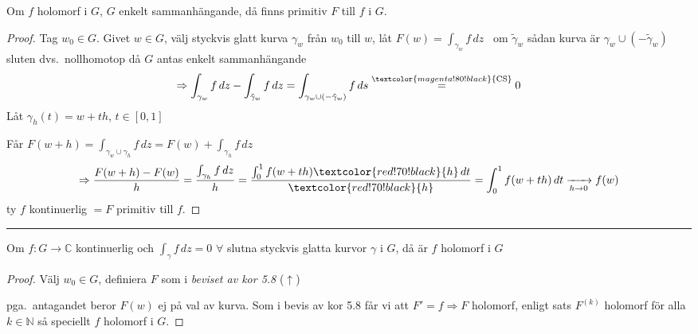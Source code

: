 \begin{theorem}[Kor 5.8]
Om $f$ holomorf i $G$, $G$ enkelt sammanhängande, då finns primitiv $F$ till $f$ i $G$.
\end{theorem}
\begin{proof}
Tag $w_0 \in G$. Givet $w \in G$, välj styckvis glatt kurva $\gamma_w$ från $w_0$ till $w$, låt $F(w) = \displaystyle\int_{\gamma_w} f\,dz$ \ om $\tilde{\gamma}_w$ sådan kurva är $\gamma_w \cup (-\tilde{\gamma}_w)$ sluten dvs.\ nollhomotop då $G$ antas enkelt sammanhängande
\[ \Rightarrow \int_{\gamma_w} f\,dz - \int_{\tilde{\gamma}_w} f\,dz = \int_{\gamma_w \cup (-\tilde{\gamma}_w)} f\,ds \overset{\textcolor{magenta!80!black}{\text{CS}}}{=} 0 \]
Låt $\gamma_h(t) = w + th$, $t \in [0, 1]$

Får $F(w + h) = \displaystyle\int_{\gamma_w \cup \gamma_h} f\,dz = F(w) + \int_{\gamma_h} f\,dz$
\[ \Rightarrow \frac{F(w + h) - F(w)}{h} = \frac{\int_{\gamma_h} f\,dz}{h} = \frac{\int_0^1 f(w + th)\textcolor{red!70!black}{h}\,dt}{\textcolor{red!70!black}{h}} = \int_0^1 f(w + th)\,dt \xrightarrow[h \to 0]{} f(w) \]
ty $f$ kontinuerlig $= F$ primitiv till $f$.
\end{proof}

\noindent\rule{\linewidth}{0.4pt}

\begin{theorem}
Om $f : G \to \mathbb{C}$ kontinuerlig och $\displaystyle\int_\gamma f\,dz = 0$ $\forall$ slutna styckvis glatta kurvor $\gamma$ i $G$, då är $f$ holomorf i $G$
\end{theorem}
\begin{proof}
Välj $w_0 \in G$, definiera $F$ som i \emph{beviset av kor 5.8} \textcolor{red!70!black}{($\uparrow$)}

pga.\ antagandet beror $F(w)$ ej på val av kurva. Som i bevis av kor 5.8 får vi att $F' = f \Rightarrow F$ holomorf, enligt sats $F^{(k)}$ holomorf för alla $k \in \mathbb{N}$ så speciellt $f$ holomorf i $G$.
\end{proof}

